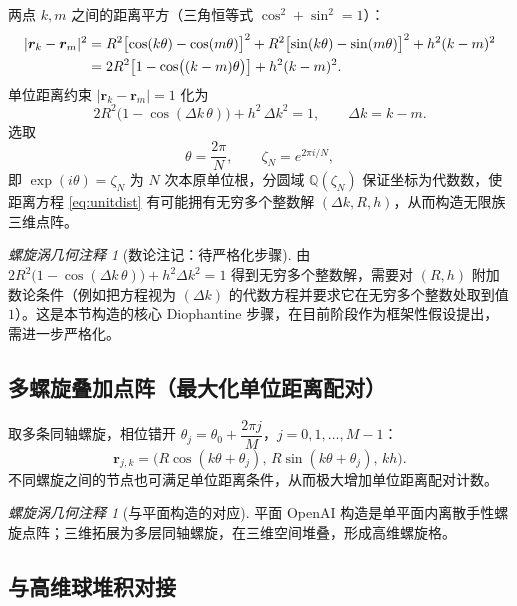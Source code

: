 \documentclass[11pt,a4paper]{article}
\newcommand{\br}{\bm{r}}
\theoremstyle{remark}
\newtheorem{remark}[theorem]{螺旋涡几何注释}
\begin{document}
两点 $k,m$ 之间的距离平方（三角恒等式 $\cos^{2}+\sin^{2}=1$）：
\begin{align}
\label{eq:dist}
|\br_{k}-\br_{m}|^{2}
&=R^{2}\bigl[\cos(k\theta)-\cos(m\theta)\bigr]^{2}
+R^{2}\bigl[\sin(k\theta)-\sin(m\theta)\bigr]^{2}+h^{2}(k-m)^{2}\notag\\
&=2R^{2}\bigl[1-\cos\bigl((k-m)\theta\bigr)\bigr]+h^{2}(k-m)^{2}.
\end{align}
单位距离约束 $|\br_{k}-\br_{m}|=1$ 化为
\begin{equation}
\label{eq:unitdist}
2R^{2}\bigl(1-\cos(\Delta k\,\theta)\bigr)+h^{2}\,\Delta k^{2}=1,\qquad \Delta k=k-m.
\end{equation}
选取
\begin{equation}
\label{eq:cyclo}
\theta=\frac{2\pi}{N},\qquad \zeta_{N}=e^{2\pi i/N},
\end{equation}
即 $\exp(i\theta)=\zeta_N$ 为 $N$ 次本原单位根，分圆域 $\mathbb{Q}(\zeta_N)$ 保证坐标为代数数，使距离方程 \eqref{eq:unitdist} 有可能拥有无穷多个整数解 $(\Delta k,R,h)$，从而构造无限族三维点阵。

\begin{remark}[数论注记：待严格化步骤]
由 $2R^{2}\bigl(1-\cos(\Delta k\,\theta)\bigr)+h^{2}\Delta k^{2}=1$ 得到无穷多个整数解，需要对 $(R,h)$ 附加数论条件（例如把方程视为 $(\Delta k)$ 的代数方程并要求它在无穷多个整数处取到值 $1$）。这是本节构造的核心 Diophantine 步骤，在目前阶段作为框架性假设提出，需进一步严格化。
\end{remark}

\subsection{多螺旋叠加点阵（最大化单位距离配对）}

取多条同轴螺旋，相位错开 $\theta_{j}=\theta_{0}+\dfrac{2\pi j}{M}$，$j=0,1,\dots,M-1$：
\begin{equation}
\label{eq:multihelix}
\br_{j,k}=\bigl(R\cos(k\theta+\theta_{j}),\,R\sin(k\theta+\theta_{j}),\,kh\bigr).
\end{equation}
不同螺旋之间的节点也可满足单位距离条件，从而极大增加单位距离配对计数。

\begin{remark}[与平面构造的对应]
平面 OpenAI 构造是单平面内离散手性螺旋点阵；三维拓展为多层同轴螺旋，在三维空间堆叠，形成高维螺旋格。
\end{remark}

\subsection{与高维球堆积对接}
\end{document}

